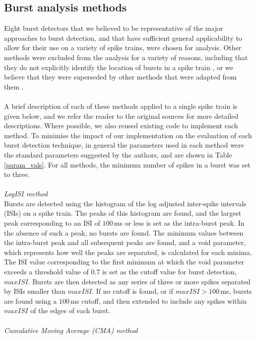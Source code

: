 \documentclass[12pt, titlepage]{article}
\begin{document}
	\subsection*{Burst analysis methods}
	Eight burst detectors that we believed to be representative of the major approaches to burst detection, and that have sufficient general applicability to allow for their use on a variety of spike trains, were chosen for analysis. Other methods were excluded from the analysis for a variety of reasons, including that they do not explicitly identify the location of bursts in a spike train \cite{VanElburg2004}, or we believe that they were superseded by other methods that were adapted from them \cite{Selinger2007,Chiappalone2005}. 
	\\ \\ A brief description of each of these methods applied to a single spike train is given below, and we refer the reader to the original sources for more detailed descriptions. Where possible, we also reused existing code to implement each method. To minimise the impact of our implementation on the evaluation of each burst detection technique, in general the parameters used in each method were the standard parameters suggested by the authors, and are shown in Table \ref{param_vals}.  For all methods, the minimum number of spikes in a burst was set to three. 
	\\ \\ \textit{LogISI method \cite{Pasquale2010}} 
	\\Bursts are detected using the histogram of the log adjusted inter-spike intervals (ISIs) on a spike train. The peaks of this histogram are found, and the largest peak corresponding to an ISI of $100\,$ms or less is set as the intra-burst peak. In the absence of such a peak, no bursts are found. The minimum values between the intra-burst peak and all subsequent peaks are found, and a void parameter, which represents how well the peaks are separated, is calculated for each minima. The ISI value corresponding to the first minimum at which the void parameter exceeds a threshold value of 0.7 is set as the cutoff value for burst detection, $maxISI$.  Bursts are then detected as any series of three or more spikes separated by ISIs smaller than $maxISI$. If no cutoff is found, or if $maxISI>100\,$ms, bursts are found using a $100\,$ms cutoff, and then extended to include any spikes within $maxISI$ of the edges of each burst.
	\\ \\ \textit{Cumulative Moving Average (CMA) method \cite{Kapucu2012}} 
\end{document}
